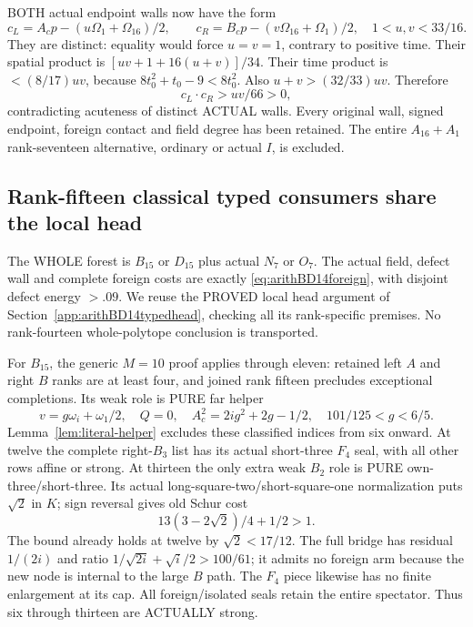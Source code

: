 \documentclass[11pt]{article}
\begin{document}
BOTH actual endpoint walls now have the form
\[
 c_L=A_cp-(u\Omega_1+\Omega_{16})/2,\qquad
 c_R=B_cp-(v\Omega_{16}+\Omega_1)/2,
                \quad1<u,v<33/16 .
\]
They are distinct: equality would force
\(u=v=1\), contrary to positive time.
Their spatial product is
\([uv+1+16(u+v)]/34\).
Their time product is \(<(8/17)uv\),
because \(8t_0^2+t_0-9<8t_0^2\).
Also \(u+v>(32/33)uv\).
Therefore
\[
                           c_L\cdot c_R>uv/66>0 ,
\]
contradicting acuteness of distinct ACTUAL
walls.
Every original wall, signed endpoint,
foreign contact and field degree has
been retained.
The entire \(A_{16}+A_1\) rank-seventeen
alternative, ordinary or actual \(I\),
is excluded.

\subsection{Rank-fifteen classical typed consumers share the local head}
\label{app:arithBD15typed}

The WHOLE forest is \(B_{15}\) or \(D_{15}\)
plus actual \(N_7\) or \(O_7\).
The actual field, defect wall and complete
foreign costs are exactly
\eqref{eq:arithBD14foreign}, with disjoint
defect energy \(>.09\).
We reuse the PROVED local head argument
of Section~\ref{app:arithBD14typedhead},
checking all its rank-specific premises.
No rank-fourteen whole-polytope conclusion
is transported.

For \(B_{15}\), the generic \(M=10\)
proof applies through eleven: retained left
\(A\) and right \(B\) ranks are at least
four, and joined rank fifteen precludes
exceptional completions.
Its weak role is PURE far helper
\[
 v=g\omega_i+\omega_1/2,\quad Q=0,\quad
 A_c^2=2ig^2+2g-1/2,\quad101/125<g<6/5 .
\]
Lemma~\ref{lem:literal-helper} excludes
these classified indices from six onward.
At twelve the complete right-\(B_3\)
list has its actual short-three \(F_4\)
seal, with all other rows affine or strong.
At thirteen the only extra weak \(B_2\)
role is PURE own-three/short-three.
Its actual long-square-two/short-square-one
normalization puts \(\sqrt2\) in \(K\);
sign reversal gives old Schur cost
\[
                    13(3-2\sqrt2)/4+1/2>1 .
\]
The bound already holds at twelve by
\(\sqrt2<17/12\).
The full bridge has residual \(1/(2i)\)
and ratio \(1/\sqrt{2i}+\sqrt i/2>100/61\);
it admits no foreign arm because the new
node is internal to the large \(B\) path.
The \(F_4\) piece likewise has no finite
enlargement at its cap.
All foreign/isolated seals retain the
entire spectator.
Thus six through thirteen are ACTUALLY
strong.
\end{document}
